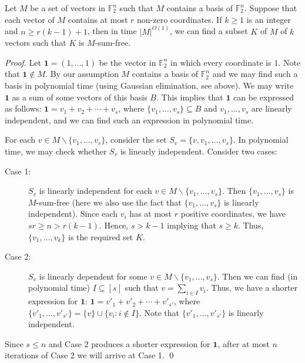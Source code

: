\documentclass{llncs}
\begin{document}
\begin{lemma}\label{thmKcon}
Let $M$ be a set of vectors in $\mathbb{F}^n_2$ such that $M$ contains a basis of $\mathbb{F}^n_2.$ Suppose that each vector of $M$ contains at most $r$ non-zero coordinates. If $k\ge 1$ is an integer and $n \ge r(k-1)+1$, then
in time $|M|^{O(1)}$, we can find a subset $K$ of $M$ of $k$ vectors
such that $K$ is $M$-sum-free.
\end{lemma}
\begin{proof}
Let $\mathbf{1} = (1, \ldots, 1)$ be the vector in $\mathbb{F}^n_2$ in which every coordinate is $1$. Note that $\mathbf{1}\not\in M.$
By our assumption $M$ contains a basis of $\mathbb{F}_2^n$ and we may find such a basis in polynomial time (using Gaussian elimination, see above).
We may write $\mathbf{1}$ as a sum of some vectors of this basis $B$. This implies that $\mathbf{1}$ can be expressed as follows: $\mathbf{1} = v_1 + v_2 + \cdots + v_s$, where $\{v_1, \ldots, v_s\}\subseteq B$ and $v_1, \ldots, v_s$ are linearly independent, and we can find such an expression in polynomial time.

For each $v \in M \backslash \{v_1, \ldots, v_s\}$, consider the set $S_v=\{v, v_1, \ldots, v_s\}$. In polynomial time, we may check whether $S_v$ is linearly independent. Consider two cases:

\begin{description}
  \item[Case 1:] $S_v$ is linearly independent for each $v \in M \backslash \{v_1, \ldots, v_s\}$. Then $\{v_1, \ldots, v_s\}$ is $M$-sum-free (here we also use the fact that $\{v_1, \ldots, v_s\}$ is linearly independent). Since each $v_i$ has at most $r$ positive coordinates, we have $sr\ge n> r(k-1)$. Hence, $s>k-1$ implying that $s\ge k$. Thus, $\{v_1, \ldots, v_k\}$ is the required set $K$.
  \item[Case 2:] $S_v$ is linearly dependent for some $v\in M \backslash \{v_1, \ldots, v_s\}$. Then we can find (in polynomial time) $I \subseteq [s]$ such that $v=\sum_{i \in I} v_i$. Thus, we have a shorter expression for $\mathbf{1}$: $\mathbf{1} = v'_1 + v'_2 + \cdots + v'_{s'}$, where $\{v'_1, \ldots , v'_{s'}\}=\{v\} \cup \{ v_i : i \notin I\}$. Note that $\{v'_1, \ldots , v'_{s'}\}$ is linearly independent.
\end{description}

Since $s\le n$ and Case 2 produces a shorter expression for $\mathbf{1}$, after at most $n$ iterations of Case 2 we will arrive at Case 1.
 \qed \end{proof}
\end{document}
